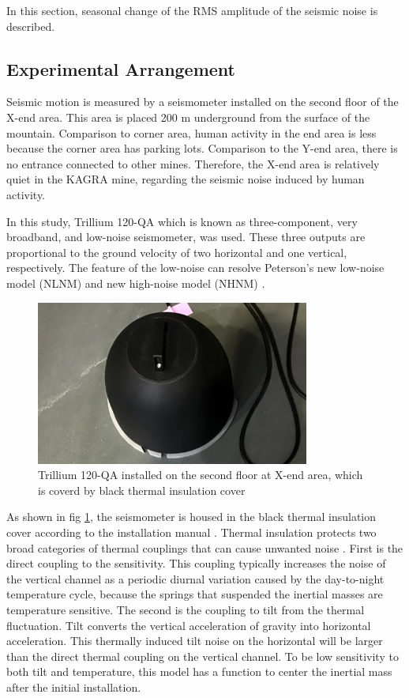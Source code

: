 In this section, seasonal change of the RMS amplitude of the seismic noise is described.


\subsection{Experimental Arrangement}
Seismic motion is measured by a seismometer installed on the second floor of the X-end area. This area is placed 200 $\mathrm{m}$ underground from the surface of the mountain. Comparison to corner area, human activity in the end area is less because the corner area has parking lots. Comparison to the Y-end area, there is no entrance connected to other mines. Therefore, the X-end area is relatively quiet in the KAGRA mine, regarding the seismic noise induced by human activity.

In this study, Trillium 120-QA which is known as three-component, very broadband, and low-noise seismometer, was used. These three outputs are proportional to the ground velocity of two horizontal and one vertical, respectively. The feature of the low-noise can resolve  Peterson's new low-noise model (NLNM) and new high-noise model (NHNM) \cite{peterson1993observations}.

\begin{figure}[H]
  \begin{center}   
    \includegraphics[width=9.0cm]{./img_chap3/img316.png}
    \caption{Trillium 120-QA installed on the second floor at X-end area, which is coverd by black thermal insulation cover}\label{img:img316}
  \end{center}
\end{figure}

As shown in fig \ref{img:img316}, the seismometer is housed in the black thermal insulation cover according to the installation manual \cite{trillium120manual}. Thermal insulation protects two broad categories of thermal couplings that can cause unwanted noise \cite{trillium120manual}. First is the direct coupling to the sensitivity. This coupling typically increases the noise of the vertical channel as a periodic diurnal variation caused by the day-to-night temperature cycle, because the springs that suspended the inertial masses are temperature sensitive. The second is the coupling to tilt from the thermal fluctuation. Tilt converts the vertical acceleration of gravity into horizontal acceleration. This thermally induced tilt noise on the horizontal will be larger than the direct thermal coupling on the vertical channel. To be low sensitivity to both tilt and temperature, this model has a function to center the inertial mass after the initial installation.

